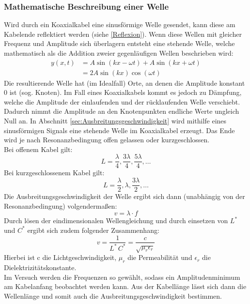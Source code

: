 \documentclass[a4paper,10pt,twocolumn]{scrartcl} %
\begin{document}
		\subsubsection{Mathematische Beschreibung einer Welle} \label{MathWell}
			Wird durch ein Koaxialkabel eine sinusförmige Welle gesendet, kann diese am Kabelende reflektiert werden (siehe \ref{Reflexion}).
			Wenn diese Wellen mit gleicher Frequenz und Amplitude sich überlagern entsteht eine stehende Welle, 
			welche mathematisch als die Addition zweier gegenläufigen Wellen beschrieben wird:
			\begin{equation*}
			\begin{split}
				y(x,t) &= A \sin(kx - \omega t) + A \sin(kx + \omega t) \\
						&= 2A \sin(kx)\cos(\omega t)
			\end{split}
			\end{equation*}
			Die resultierende Welle hat (im Idealfall) Orte, an denen die Amplitude konstant 0 ist (sog. Knoten).
			Im Fall eines Koaxialkabels kommt es jedoch zu Dämpfung, welche die Amplitude der einlaufenden und der rücklaufenden Welle verschiebt.
			Dadurch nimmt die Amplitude an den Knotenpunkten endliche Werte ungleich Null an.
			In Abschnitt \ref{sec:Ausbreitungsgeschwindigkeit} wird mithilfe eines sinusförmigen Signals eine stehende Welle im Koaxialkabel erzeugt.
			Das Ende wird je nach Resonanzbedingung offen gelassen oder kurzgeschlossen.\\
			Bei offenem Kabel gilt:
			\begin{equation}
				L = \frac{\lambda}{4}, \frac{3 \lambda}{4}, \frac{5 \lambda}{4}, \ldots
			\label{WellenlängeOffen}
			\end{equation}
			Bei kurzgeschlossenem Kabel gilt:
			\begin{equation}
				L = \frac{\lambda}{2}, \lambda, \frac{3 \lambda}{2}, \ldots
			\label{WellenlängeGeschlossen}
			\end{equation}
			Die Ausbreitungsgeschwindigkeit der Welle ergibt sich dann (unabhängig von der Resonanzbedingung) volgendermaßen:
			\begin{equation*}
				v = \lambda \cdot f
			\label{Ausbreitungsgeschwindigkeit}
			\end{equation*}
			Durch lösen der eindimensionalen Wellengleichung und durch einsetzen von $L^{*}$ und $C^{*}$ ergibt sich zudem folgender Zusammenhang:
			\begin{equation*}
				v = \frac{1}{L^{\ast} \, C^{\ast}} = \frac{c}{\sqrt{\mu_r \epsilon_r}}
			\label{Ausbreitungsgeschwindigkeit2}
			\end{equation*}
			Hierbei ist c die Lichtgeschwindigkeit, $\mu_r$ die Permeabilität und $\epsilon_r$ die Dielektrizitätskonstante.\\
			Im Versuch werden die Frequenzen so gewählt, sodass ein Amplitudenminimum am Kabelanfang beobachtet werden kann. Aus der Kabellänge lässt sich dann die Wellenlänge
			und somit auch die Ausbreitungsgeschwindigkeit bestimmen.
\end{document}
